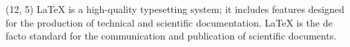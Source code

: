 \documentclass[]{article}
\begin{document}
    \setlength{\TPHorizModule}{1cm}
    \setlength{\TPVertModule}{1cm}
    \begin{textblock}{5}(12, 5)
        LaTeX is a high-quality typesetting system; it includes features designed for the production of technical and scientific documentation. LaTeX is the de facto standard for the communication and publication of scientific documents. 
    \end{textblock}
\end{document}
